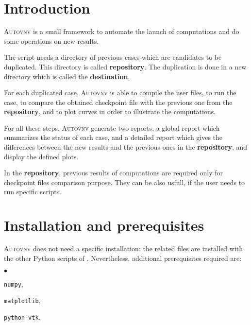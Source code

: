 \documentclass[a4paper,10pt,twoside]{csshortdoc}
\begin{document}
\def\contentsname{\textbf{\normalsize TABLE OF CONTENTS}\pdfbookmark[1]{Table of
contents}{contents}}

\renewcommand{\logocs}{cs_logo_wave}

\large
\makepdgCS
\normalsize

\passepage

\begin{center}\begin{singlespace}
\tableofcontents
\end{singlespace}\end{center}
%
\section{Introduction}

\textsc{Autovnv} is a small framework to automate the launch of \CS computations
and do some operations on new results.

The script needs a directory of previous \CS cases which are candidates to be
duplicated. This directory is called \textbf{repository}. The duplication is
done in a new directory which is called the \textbf{destination}.

For each duplicated case, \textsc{Autovnv} is able to compile the user files, to
run the case, to compare the obtained checkpoint file with the previous one from
the \textbf{repository}, and to plot curves in order to illustrate the
computations.

For all these steps, \textsc{Autovnv} generate two reports, a global report
which summarizes the status of each case, and a detailed report which gives the
differences between the new results and the previous ones in the
\textbf{repository}, and display the defined plots.

In the \textbf{repository}, previous results of computations are required only
for checkpoint files comparison purpose. They can be also usfull, if the user
needs to run specific scripts.

\section{Installation and prerequisites}

\textsc{Autovnv} does not need a specific installation: the related files are
installed with the other Python scripts of \CS. Nevertheless, additional
prerequisites required are:
\begin{list}{$\bullet$}{}
\item \texttt{numpy},
\item \texttt{matplotlib},
\item \texttt{python-vtk}.
\end{list}
\end{document}
